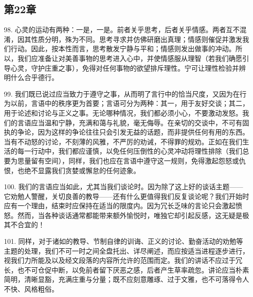 \subsection{第22章}

\par

98. 心灵的运动有两种：一是，一是。前者关乎思考，后者关乎情感。两者互不混淆，因其性质分明，殊为不同。思考寻求并仿佛研磨出真理；情感则催促并激发我们行动。因此，按本性而言，思考散发宁静与平和；情感则发出做事的冲动。所以，我们应准备让对美善事物的思考进入心中，并使情感服从理智（若我们确愿引导心灵，守护庄重之事），免得对任何事物的欲望排斥理性。宁可让理性检验并辨明什么合乎德行。\par

99. 我们既已说过应当致力于遵守之事，从而明了言行中的恰当尺度，又因为在行为以前，言语中的秩序更为首要；言语可分为两种：其一，用于友好交谈；其二，用于论述和讨论与正义之事。无论哪种情况，我们都必须小心，不要激动发怒。我们的言语应当温和宁静，充满和蔼与礼貌，毫无侮辱。在亲切的交谈中，不可有固执的争论，因为这样的争论往往只会引发无益的话题，而非提供任何有用的东西。当有不动怒的讨论，不刻薄的风雅，不严厉的劝诫，不得罪的规劝。正如在我们生活的每一行动中，我们都应谨慎，以免任何压倒性的心灵冲动将理性排除（我们总要为思量留有空间），同样，我们也应在言语中遵守这一规则，免得激起怨怒或仇恨，也绝不显露我们贪婪或懈怠的任何迹象。\par

100. 我们的言语应当如此，尤其当我们谈论时。因为除了这上好的谈话主题——它劝勉人警醒，关切良善的教导——还有什么更值得我们反复谈论呢？我们开始时应有一个理由，结束时应保持在适当的限度内。因为冗长乏味的言论只会激起愤怒。然而，当各种谈话通常都能带来额外愉悦时，唯独它却引起反感，这无疑是极其不合宜的！\par

101. 同样，对于诸如的教导、节制自律的训诲、正义的讨论、勤奋活动的劝勉等主题的处理，我们不可一时之间全盘托出、详尽阐述，而应按适当进程逐步进行，视我们力所能及以及经文段落的内容所允许的范围而定。我们的讲话不应过于冗长，也不可仓促中断，以免前者留下厌恶之感，后者产生草率疏忽。讲论应当朴素简明，清晰显豁，充满庄重与分量；既不应刻意雕琢、过于文雅，也不可落得令人不快、风格粗俗。\par


